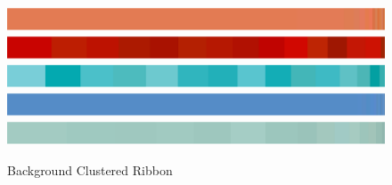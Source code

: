 \documentclass{article}
\begin{document}
\begin{figure}[htbp]
    \centering
        {\includegraphics[width=\textwidth]{main_files/figure-latex/15_1_orange_marilyn_background_color_ribbon.pdf}}
        {\includegraphics[width=\textwidth]{main_files/figure-latex/18_1_red_marilyn_background_color_ribbon.pdf}}
        {\includegraphics[width=\textwidth]{main_files/figure-latex/21_1_turq_marilyn_background_color_ribbon.pdf}}
        {\includegraphics[width=\textwidth]{main_files/figure-latex/24_1_blue_marilyn_background_color_ribbon.pdf}}
        {\includegraphics[width=\textwidth]{main_files/figure-latex/27_1_eggblue_marilyn_background_color_ribbon.pdf}}
    \caption{Background Clustered Ribbon}
\end{figure}
\end{document}
